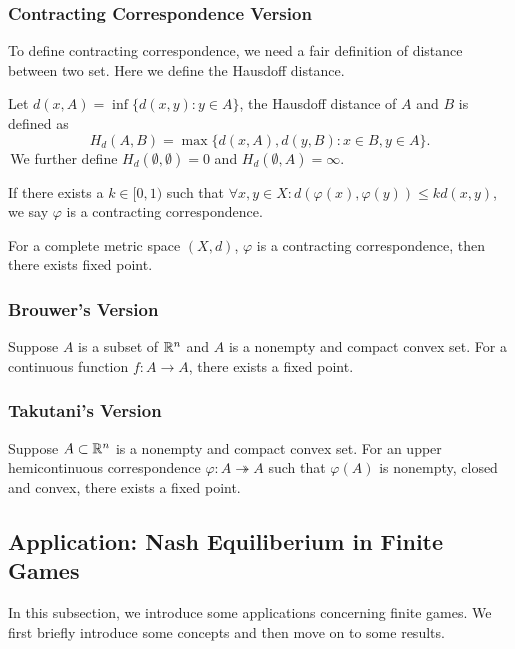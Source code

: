 \subsubsection{Contracting Correspondence Version}
To define contracting correspondence, we need a fair definition of distance between two set. Here we define the Hausdoff distance.
\begin{definition}
    Let $d(x,A) = \inf \{d(x,y): y\in A\}$, the Hausdoff distance of $A$ and $B$ is defined as 
    $$H_d (A,B) = \max \{d(x,A),d(y,B):x\in B, y\in A\}.$$ 
    \,We further define $H_d(\emptyset,\emptyset) = 0 $ and $H_d(\emptyset,A) = \infty.$
\end{definition}

\begin{definition}
    If there exists a $k\in [0,1)$ such that $\forall x,y\in X: d(\varphi(x),\varphi(y))\leq k d(x,y)$, we say $\varphi$ is a contracting correspondence.
\end{definition}

\begin{theorem}
    For a complete metric space $(X,d)$, $\varphi$ is a contracting correspondence, then there exists fixed point.
\end{theorem}

\subsubsection{Brouwer's Version}
\begin{theorem}[Brouwer]
    Suppose $A$ is a subset of $\mathbb{R}^n$ and $A$ is a nonempty and compact convex set. For a continuous function $f:A\to A$, there exists a fixed point.
\end{theorem}

\subsubsection{Takutani's Version}
\begin{theorem}[Takutani]
    Suppose $A\subset \mathbb{R}^n$ is a nonempty and compact convex set. For an upper hemicontinuous correspondence $\varphi:A\twoheadrightarrow A$ such that $\varphi(A)$ is nonempty, closed and convex, there exists a fixed point.
\end{theorem}

\subsection{Application: Nash Equiliberium in Finite Games}
In this subsection, we introduce some applications concerning finite games. We first briefly introduce some concepts and then move on to some results.

